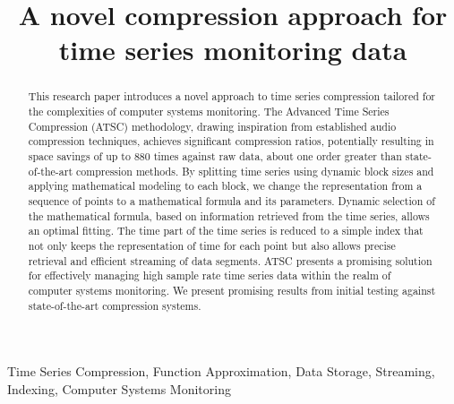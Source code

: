 \documentclass[conference]{IEEEtran}
\begin{document}
\title{A novel compression approach for time series monitoring data\\}

\author{
\and
{}
\and
{}
}

\maketitle

\begin{abstract}
    This research paper introduces a novel approach to time series compression tailored for the complexities of computer systems monitoring.
    The Advanced Time Series Compression (ATSC) methodology, drawing inspiration from established audio compression techniques, achieves significant compression ratios, potentially resulting in space savings of up to 880 times against raw data, about one order greater than state-of-the-art compression methods.
    By splitting time series using dynamic block sizes and applying mathematical modeling to each block, we change the representation from a sequence of points to a mathematical formula and its parameters.
    Dynamic selection of the mathematical formula, based on information retrieved from the time series, allows an optimal fitting.
    The time part of the time series is reduced to a simple index that not only keeps the representation of time for each point but also allows precise retrieval and efficient streaming of data segments. 
    ATSC presents a promising solution for effectively managing high sample rate time series data within the realm of computer systems monitoring.
    We present promising results from initial testing against state-of-the-art compression systems. 
\end{abstract}
\vspace{5pt}
\begin{IEEEkeywords}
Time Series Compression, Function Approximation, Data Storage, Streaming, Indexing, Computer Systems Monitoring
\end{IEEEkeywords}
\end{document}
